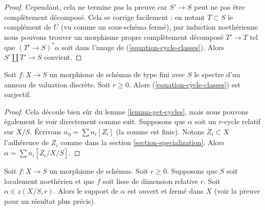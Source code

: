 \begin{proof}
\medskip\noindent
 Cependant, cela ne termine pas la preuve car  $S' \to S$  peut ne pas 
être complètement décomposé. Cela se corrige facilement : en notant  $T \subset S$
  le complément de  $U$  (vu comme un sous-schéma fermé), par induction 
noethérienne nous pouvons trouver un morphisme propre complètement décomposé 
$T' \to T$  tel que  $(T' \to S)^*\alpha$
  soit dans l'image de (\ref{equation-cycle-classes}). Alors 
$S' \amalg T' \to S$  convient. 
\end{proof} 

\begin{lemma} 
\label{lemma-get-cycles-dvr} 
Soit  $f : X \to S$  un morphisme de schémas de type fini avec  $S$
  le spectre d'un anneau de valuation discrète. Soit  $r \geq 0$.
 Alors (\ref{equation-cycle-classes}) est surjectif. 
\end{lemma} 

\begin{proof}
 Cela découle bien sûr du lemme \ref{lemma-get-cycles}, mais nous pouvons 
également le voir directement comme suit. Supposons que  $\alpha$  soit un  $r$-cycle relatif
 sur  $X/S$. Écrivons  $\alpha_\eta = \sum n_i[Z_i]$  (la somme est finie). Notons 
$\overline{Z}_i \subset X$  l'adhérence de  $Z_i$  comme 
dans la section \ref{section-specialization}. Alors 
$\alpha = \sum n_i[\overline{Z}_i/X/S]$. 
\end{proof} 

\begin{lemma} 
\label{lemma-relative-cycle-smooth} 
Soit  $f : X \to S$  un morphisme de schémas. Soit  $r \geq 0$. Supposons que $S$
 soit localement noethérien et que $f$ soit lisse de dimension relative $r$. Soit  
$\alpha \in z(X/S, r)$. Alors le support de  $\alpha$  est ouvert et fermé dans  $X$
  (voir la preuve pour un résultat plus précis). 
\end{lemma} 

